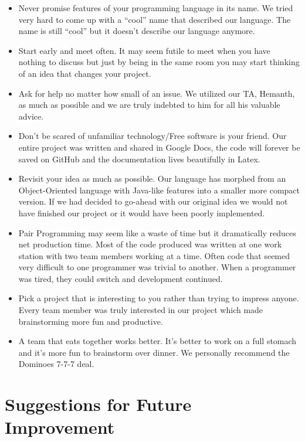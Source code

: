 \documentclass[12pt]{report}
\begin{document}
\begin{itemize}
\item Never promise features of your programming language in its name. We tried very hard to come up with a “cool” name that described our language. The name is still “cool” but it doesn’t describe our language anymore.
\item Start early and meet often. It may seem futile to meet when you have nothing to discuss but just by being in the same room you may start thinking of an idea that changes your project.
\item Ask for help no matter how small of an issue. We utilized our TA, Hemanth, as much as possible and we are truly indebted to him for all his valuable advice.
\item Don’t be scared of unfamiliar technology/Free software is your friend. Our entire project was written and shared in Google Docs, the code will forever be saved on GitHub and the documentation lives beautifully in Latex.
\item Revisit your idea as much as possible. Our language has morphed from an Object-Oriented language with Java-like features into a smaller more compact version. If we had decided to go-ahead with our original idea we would not have finished our project or it would have been poorly implemented.
\item Pair Programming may seem like a waste of time but it dramatically reduces net production time. Most of the code produced was written at one work station with two team members working at a time. Often code that seemed very difficult to one programmer was trivial to another. When a programmer was tired, they could switch and development continued.
\item Pick a project that is interesting to you rather than trying to impress anyone. Every team member was truly interested in our project which made brainstorming more fun and productive. 
\item A team that eats together works better. It’s better to work on a full stomach and it’s more fun to brainstorm over dinner. We personally recommend the Dominoes 7-7-7 deal.
\end{itemize}

\section{Suggestions for Future Improvement}
\end{document}

